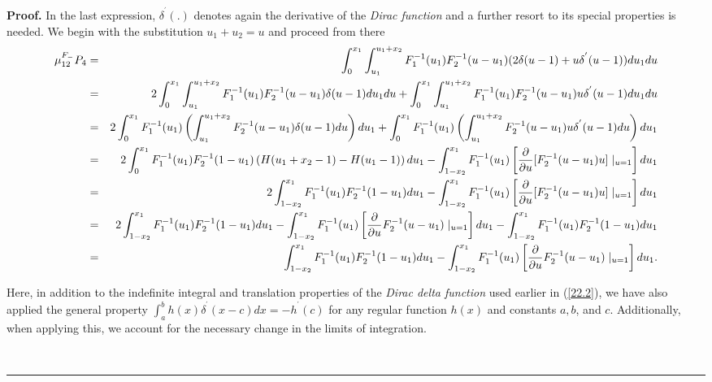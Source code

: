 \documentclass[onecolumn]{article}
\providecommand{\dint}{\displaystyle\int}
\newenvironment{proof}[1][Proof]{\noindent\textbf{#1.} }{\ \rule{0.5em}{0.5em}}
\renewcommand{\dint}{\displaystyle\int}
\begin{document}
\begin{proof}
In the last expression, $\delta ^{^{\prime }}(.)$ denotes again the
derivative of the \textit{Dirac function} and a further resort to its
special properties is needed. We begin with the substitution $u_{1}+u_{2}=u$
and proceed from there%
\begin{eqnarray}
\mu _{12}^{F_{-}}P_{4}
&=&\dint\nolimits_{0}^{x_{1}}\dint%
\nolimits_{u_{1}}^{u_{1}+x_{2}}F_{1}^{-1}(u_{1})F_{2}^{-1}(u-u_{1})(2\delta
(u-1)+u\delta ^{^{\prime }}(u-1))du_{1}du  \notag \\
&=&2\dint\nolimits_{0}^{x_{1}}\dint%
\nolimits_{u_{1}}^{u_{1}+x_{2}}F_{1}^{-1}(u_{1})F_{2}^{-1}(u-u_{1})\delta
(u-1)du_{1}du+\dint\nolimits_{0}^{x_{1}}\dint%
\nolimits_{u_{1}}^{u_{1}+x_{2}}F_{1}^{-1}(u_{1})F_{2}^{-1}(u-u_{1})u\delta
^{^{\prime }}(u-1)du_{1}du  \notag \\
&=&2\dint\nolimits_{0}^{x_{1}}F_{1}^{-1}(u_{1})\left(
\dint\nolimits_{u_{1}}^{u_{1}+x_{2}}F_{2}^{-1}(u-u_{1})\delta (u-1)du\right)
du_{1}+\dint\nolimits_{0}^{x_{1}}F_{1}^{-1}(u_{1})\left(
\dint\nolimits_{u_{1}}^{u_{1}+x_{2}}F_{2}^{-1}(u-u_{1})u\delta ^{^{\prime
}}(u-1)du\right) du_{1}  \notag \\
&=&2\dint\nolimits_{0}^{x_{1}}F_{1}^{-1}(u_{1})F_{2}^{-1}(1-u_{1})\left(
H(u_{1}+x_{2}-1)-H(u_{1}-1)\right)
du_{1}-\dint\nolimits_{1-x_{2}}^{x_{1}}F_{1}^{-1}(u_{1})\left[ \frac{%
\partial }{\partial u}[F_{2}^{-1}(u-u_{1})u]\mid _{u=1}\right] du_{1}  \notag
\\
&=&2\dint%
\nolimits_{1-x_{2}}^{x_{1}}F_{1}^{-1}(u_{1})F_{2}^{-1}(1-u_{1})du_{1}-\dint%
\nolimits_{1-x_{2}}^{x_{1}}F_{1}^{-1}(u_{1})\left[ \frac{\partial }{\partial
u}[F_{2}^{-1}(u-u_{1})u]\mid _{u=1}\right] du_{1}  \notag \\
&=&2\dint%
\nolimits_{1-x_{2}}^{x_{1}}F_{1}^{-1}(u_{1})F_{2}^{-1}(1-u_{1})du_{1}-\dint%
\nolimits_{1-x_{2}}^{x_{1}}F_{1}^{-1}(u_{1})\left[ \frac{\partial }{\partial
u}F_{2}^{-1}(u-u_{1})\mid _{u=1}\right] du_{1}-\dint%
\nolimits_{1-x_{2}}^{x_{1}}F_{1}^{-1}(u_{1})F_{2}^{-1}(1-u_{1})du_{1}  \notag
\\
&=&\dint%
\nolimits_{1-x_{2}}^{x_{1}}F_{1}^{-1}(u_{1})F_{2}^{-1}(1-u_{1})du_{1}-\dint%
\nolimits_{1-x_{2}}^{x_{1}}F_{1}^{-1}(u_{1})\left[ \frac{\partial }{\partial
u}F_{2}^{-1}(u-u_{1})\mid _{u=1}\right] du_{1}.  \label{33}
\end{eqnarray}

Here, in addition to the indefinite integral and translation properties of
the \textit{Dirac delta function} used earlier in (\ref{22.2}), we have also
applied the general property $\dint\nolimits_{a}^{b}h(x)\delta ^{^{\prime
}}(x-c)dx=-h^{^{\prime }}(c)$ for any regular function $h(x)$ and constants $%
a,b$, and $c.$ Additionally, when applying this, we account for the
necessary change in the limits of integration.


\end{proof}
\end{document}
